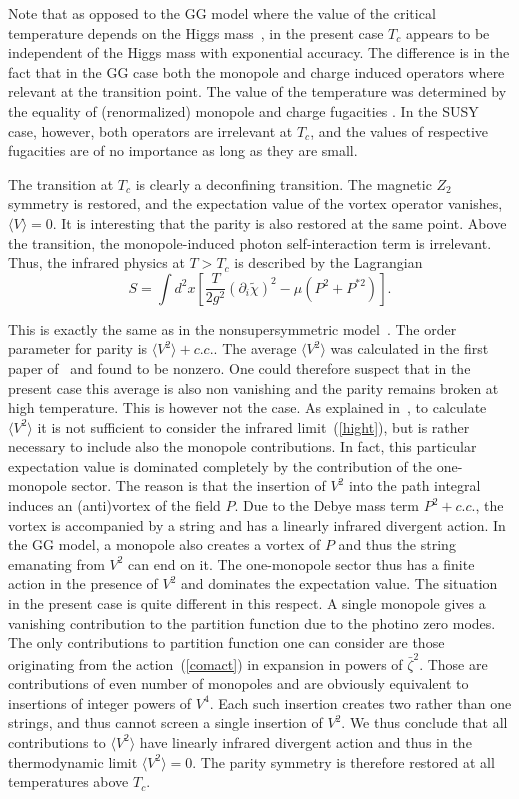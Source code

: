 \documentclass[a4paper,12pt]{article}
\begin{document}
Note that as opposed to the GG model where the value of the
critical temperature depends on the Higgs mass~\cite{2, sk}, in
the present case $T_c$ appears to be independent of the Higgs mass
with exponential accuracy. The difference is in the fact that in
the GG case both the monopole and charge induced operators where
relevant at the transition point. The value of the temperature was
determined by the equality of (renormalized) monopole and charge
fugacities \cite{sk}. In the SUSY case, however, both operators
are irrelevant at $T_c$, and the values of respective fugacities
are of no importance as long as they are small.

The transition at $T_c$ is clearly a deconfining transition. The
magnetic $Z_2$ symmetry is restored, and the expectation value of
the vortex operator vanishes, $\langle V\rangle=0$. It is
interesting that the parity is also restored at the same point.
Above the transition, the monopole-induced photon self-interaction
term is irrelevant. Thus, the infrared physics at $T>T_c$ is
described by the Lagrangian
\begin{equation} S=  \int d^2x\left[\frac{T}{2g^2}(\partial_i\tilde\chi)^2
- \mu\left(P^2+P^{*2}\right) \right].\label{hight}\end{equation}

This is exactly the same as in the nonsupersymmetric
model~\cite{gg2}. The order parameter for parity is $\langle
V^2\rangle+c.c.$. The average $\langle V^2\rangle$ was calculated
in the first paper of~\cite{gg2} and found to be nonzero. One
could therefore suspect that in the present case this average is
also non vanishing and the parity remains broken at high
temperature. This is however not the case. As explained
in~\cite{gg2}, to calculate $\langle V^2\rangle$ it is not
sufficient to consider the infrared limit~(\ref{hight}), but is
rather necessary to include also the monopole contributions. In
fact, this particular expectation value is dominated completely by
the contribution of the one-monopole sector. The reason is that
the insertion of $V^2$ into the path integral induces an
(anti)vortex of the field $P$. Due to the Debye mass term
$P^2+c.c.$, the vortex is accompanied by a string and has a
linearly infrared divergent action. In the GG model, a monopole
also creates a vortex of $P$ and thus the string emanating from
$V^2$ can end on it. The one-monopole sector thus has a finite
action in the presence of $V^2$ and dominates the expectation
value. The situation in the present case is quite different in
this respect. A single monopole gives a vanishing contribution to
the partition function due to the photino zero modes. The only
contributions to partition function one can consider are those
originating from the action~(\ref{comact}) in expansion in powers
of $\bar\zeta^2$. Those are contributions of even number of
monopoles and are obviously equivalent to insertions of integer
powers of $V^4$. Each such insertion creates two rather than one
strings, and thus cannot screen a single insertion of $V^2$. We
thus conclude that all contributions to $\langle V^2\rangle$ have
linearly infrared divergent action and thus in the thermodynamic
limit $\langle V^2\rangle=0$. The parity symmetry is therefore
restored at all temperatures above $T_c$.
\end{document}
